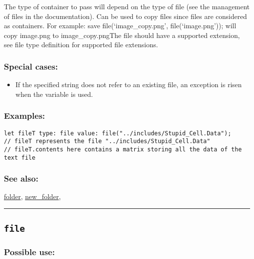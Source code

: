 \documentclass[]{book}
\providecommand{\tightlist}{%
  \setlength{\itemsep}{0pt}\setlength{\parskip}{0pt}}
\theoremstyle{definition}
\theoremstyle{definition}
\theoremstyle{definition}
\theoremstyle{remark}
\begin{document}
The type of container to pass will depend on the type of file (see the
management of files in the documentation). Can be used to copy files
since files are considered as containers. For example: save
file(`image\_copy.png', file(`image.png')); will copy image.png to
image\_copy.pngThe file should have a supported extension, see file type
definition for supported file extensions.

\subsubsection{Special cases:}\label{special-cases-60}

\begin{itemize}
\tightlist
\item
  If the specified string does not refer to an existing file, an
  exception is risen when the variable is used.
\end{itemize}

\subsubsection{Examples:}\label{examples-123}

\begin{verbatim}
let fileT type: file value: file("../includes/Stupid_Cell.Data");           // fileT represents the file "../includes/Stupid_Cell.Data"             // fileT.contents here contains a matrix storing all the data of the text file 
\end{verbatim}

\subsubsection{See also:}\label{see-also-93}

\href{OperatorsDH\#folder}{folder},
\href{OperatorsNR\#new_folder}{new\_folder},

\begin{center}\rule{0.5\linewidth}{\linethickness}\end{center}

\subsection{\texorpdfstring{\texttt{file}}{file}}\label{file-1}

\subsubsection{Possible use:}\label{possible-use-165}
\end{document}
